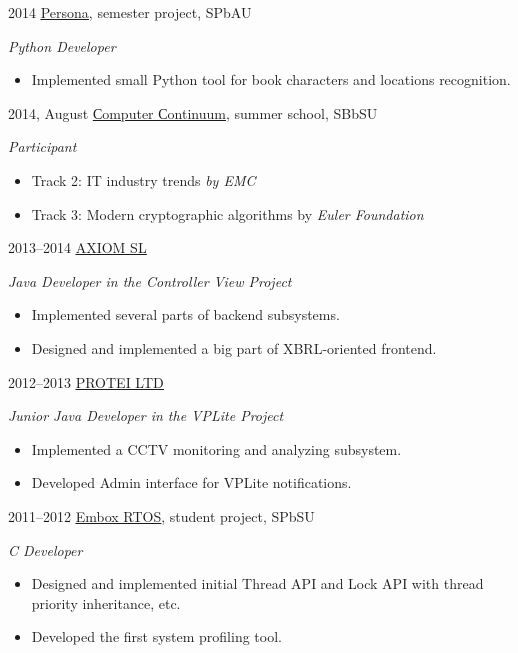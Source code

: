 \documentclass[]{friggeri-cv} %
\begin{document}
\begin{entrylist}
\entry
{2014}
{\href{https://github.com/nunberty/chars-movement-graph}{\underline{Persona}}, semester project, SPbAU}
{}
{\emph{Python Developer}
    \begin{itemize}
        \item
        Implemented small Python tool for book characters and locations recognition.
    \end{itemize}
}
\entry
{2014, August}
{\href{http://spbsu-school.org/}{\underline{Сomputer Сontinuum}}, summer school, SBbSU}
{}
{\emph{Participant}
    \begin{itemize}
        \item
        Track 2: IT industry trends \textit{by EMC}
        \item
        Track 3: Modern cryptographic algorithms by \textit{Euler Foundation}
    \end{itemize}
}
\entry
{2013--2014}
{\href{http://axiomsl.com}{\underline{AXIOM SL}}}
{}
{\emph{Java Developer in the Controller View Project}

    \begin{itemize}
    \item
        Implemented several parts of backend subsystems.
    \item
        Designed and implemented
        a big part of XBRL-oriented frontend.
    \end{itemize}
}
\entry
{2012--2013}
{\href{http://protei.com}{\underline{PROTEI LTD}}}
{}
{\emph{Junior Java Developer in the VPLite Project}
    \begin{itemize}
        \item
        Implemented a CCTV monitoring and analyzing subsystem.
        \item
        Developed Admin interface for VPLite notifications.
    \end{itemize}
}
\entry
{2011--2012}
{\href{https://code.google.com/p/embox}{\underline{Embox RTOS}}, student project, SPbSU}
{}
{\emph{C Developer}
    \begin{itemize}
        \item
        Designed and implemented initial Thread API and Lock API with thread priority inheritance, etc.
        \item
        Developed the first system profiling tool.
    \end{itemize}
}
\end{entrylist}
\end{document}
